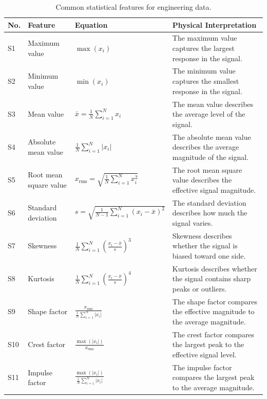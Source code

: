\documentclass[12pt,letter]{article}
\begin{document}
\begin{table}[H]
	\centering
	\caption{Common statistical features for engineering data.}
	\label{tab:statistical_features}
	\begin{tabular}{p{} p{} p{} p{}}
		\hline
		\textbf{No.} & \textbf{Feature} & \textbf{Equation} & \textbf{Physical Interpretation} \\
		\hline
		S1 & Maximum value 
		& \(\displaystyle \max(x_i)\) 
		& The maximum value captures the largest response in the signal. \\
		
		S2 & Minimum value 
		& \(\displaystyle \min(x_i)\) 
		& The minimum value captures the smallest response in the signal. \\
		
		S3 & Mean value 
		& \(\displaystyle \bar{x}=\frac{1}{N}\sum_{i=1}^{N}x_i\) 
		& The mean value describes the average level of the signal. \\
		
		S4 & Absolute mean value 
		& \(\displaystyle \frac{1}{N}\sum_{i=1}^{N}|x_i|\) 
		& The absolute mean value describes the average magnitude of the signal. \\
		
		S5 & Root mean square value 
		& \(\displaystyle x_{\mathrm{rms}}=\sqrt{\frac{1}{N}\sum_{i=1}^{N}x_i^2}\) 
		& The root mean square value describes the effective signal magnitude. \\
		
		S6 & Standard deviation 
		& \(\displaystyle s=\sqrt{\frac{1}{N-1}\sum_{i=1}^{N}(x_i-\bar{x})^2}\) 
		& The standard deviation describes how much the signal varies. \\
		
		S7 & Skewness 
		& \(\displaystyle \frac{1}{N}\sum_{i=1}^{N}\left(\frac{x_i-\bar{x}}{s}\right)^3\) 
		& Skewness describes whether the signal is biased toward one side. \\
		
		S8 & Kurtosis 
		& \(\displaystyle \frac{1}{N}\sum_{i=1}^{N}\left(\frac{x_i-\bar{x}}{s}\right)^4\) 
		& Kurtosis describes whether the signal contains sharp peaks or outliers. \\
		
		S9 & Shape factor 
		& \(\displaystyle \frac{x_{\mathrm{rms}}}{\frac{1}{N}\sum_{i=1}^{N}|x_i|}\) 
		& The shape factor compares the effective magnitude to the average magnitude. \\
		
		S10 & Crest factor 
		& \(\displaystyle \frac{\max(|x_i|)}{x_{\mathrm{rms}}}\) 
		& The crest factor compares the largest peak to the effective signal level. \\
		
		S11 & Impulse factor 
		& \(\displaystyle \frac{\max(|x_i|)}{\frac{1}{N}\sum_{i=1}^{N}|x_i|}\) 
		& The impulse factor compares the largest peak to the average magnitude. \\
		\hline
	\end{tabular}
\end{table}
\end{document}
